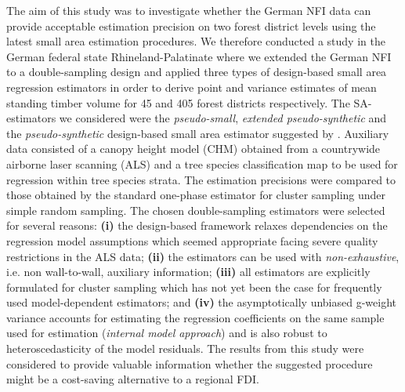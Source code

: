 The aim of this study was to investigate whether the German NFI data can provide acceptable estimation precision on two forest district levels using the latest small area estimation procedures. We therefore conducted a study in the German federal state Rhineland-Palatinate where we extended the German NFI to a double-sampling design and applied three types of design-based small area regression estimators in order to derive point and variance estimates of mean standing timber volume for 45 and 405 forest districts respectively. The SA-estimators we considered were the \textit{pseudo-small}, \textit{extended pseudo-synthetic} and the \textit{pseudo-synthetic} design-based small area estimator suggested by \citet{mandallaz2013a, mandallaz2013b}. Auxiliary data consisted of a canopy height model (CHM) obtained from a countrywide airborne laser scanning (ALS) and a tree species classification map to be used for regression within tree species strata. The estimation precisions were compared to those obtained by the standard one-phase estimator for cluster sampling under simple random sampling. The chosen double-sampling estimators were selected for several reasons: \textbf{(i)} the design-based framework relaxes dependencies on the regression model assumptions which seemed appropriate facing severe quality restrictions in the ALS data; \textbf{(ii)} the estimators can be used with \textit{non-exhaustive}, i.e. non wall-to-wall, auxiliary information; \textbf{(iii)} all estimators are explicitly formulated for cluster sampling which has not yet been the case for frequently used model-dependent estimators; and \textbf{(iv)} the asymptotically unbiased g-weight variance accounts for estimating the regression coefficients on the same sample used for estimation (\textit{internal model approach}) and is also robust to heteroscedasticity of the model residuals. The results from this study were considered to provide valuable information whether the suggested procedure might be a cost-saving alternative to a regional FDI.\par

 


